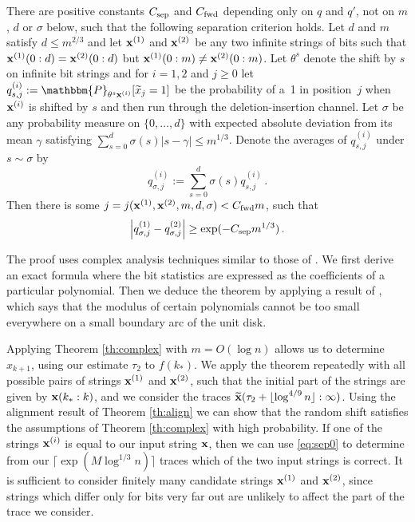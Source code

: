 \documentclass[final,12pt]{colt2018} %
\renewcommand{\P}{\mathbbm{P}}
\newcommand{\1}{\mathbf{1}}
\newcommand{\eqb}{\begin{equation}}
\newcommand{\eqe}{\end{equation}}
\newcommand{\wt}{\widetilde}
\def\x{{\bf x}}
\def\csep{C_{\rm sep}} %
\def\cfwd{C_{\rm fwd}} %
\begin{document}
\begin{theorem}
	\label{th:complex}
	There are positive constants $\csep$ and $\cfwd$ depending only on
	$q$ and $q'$, not on $m$, $d$ or $\sigma$ below, such that the
	following separation criterion holds.
	Let $d$ and $m$ satisfy $d \leq m^{2/3}$ and let $\x^{(1)}$
	and $\x^{(2)}$ be any two infinite strings of bits such that
	$\x^{(1)} (0:d) = \x^{(2)}(0:d)$ but $\x^{(1)} (0:m) \neq \x^{(2)}(0:m)$.
	Let $\theta^s$ denote the shift by $s$ on infinite bit strings and
	for $i = 1,2$ and $j \geq 0$ let $q_{s,j}^{(i)} := \P_{\theta^s \x^{(i)}}
	[\wt x_j = 1]$ be the probability of a~1 in position~$j$ when $\x^{(i)}$ is
	shifted by $s$ and then run through the deletion-insertion channel.
	Let $\sigma$ be any probability measure on $\{ 0 , \ldots , d \}$
	with expected absolute deviation from its mean $\gamma$ satisfying
	$\sum_{s=0}^d \sigma (s) |s - \gamma| \leq m^{1/3}$.  Denote the averages
	of $q^{(i)}_{s,j}$ under $s \sim \sigma$ by
	$$q_{\sigma , j}^{(i)} := \sum_{s=0}^d \sigma (s) q_{s,j}^{(i)} \, .$$
	Then there is some $j = j(\x^{(1)}, \x^{(2)}, m, d, \sigma) < \cfwd m$,
	such that
	\eqb \label{eq:sep0}
	\left | q_{\sigma , j}^{(1)} - q_{\sigma , j}^{(2)} \right |
	\geq \exp (- \csep m^{1/3}) \, .
	\eqe
\end{theorem}
The proof uses complex analysis techniques similar to those of \cite{DOS16,NP16,PZ17}. We first derive an exact formula where the bit statistics are expressed as the coefficients of a particular polynomial. Then we deduce the theorem by applying a result of \citet*{BE97}, which says that the modulus of certain polynomials cannot be too small everywhere on a small boundary arc of the unit disk.

Applying Theorem \ref{th:complex} with $m=O(\log n)$ allows us to determine $x_{k+1}$, using our estimate $\tau_2$ to $f(k_*)$. We apply the theorem repeatedly with all possible pairs of strings $\x^{(1)}$ and $\x^{(2)}$, such that the initial part of the strings are given by $\x(k_*:k)$, and we consider the traces $\wt\x(\tau_2+\lfloor\log^{4/9}n\rfloor:\infty)$. Using the alignment result of Theorem \ref{th:align} we can show that the random shift satisfies the assumptions of Theorem \ref{th:complex} with high probability. If one of the strings $\x^{(i)}$ is equal to our input string $\x$, then we can use \eqref{eq:sep0} to determine from our $\lceil\exp(M\log^{1/3}n)\rceil$ traces which of the two input strings is correct. It is sufficient to consider finitely many candidate strings $\x^{(1)}$ and $\x^{(2)}$, since strings which differ only for bits very far out are unlikely to affect the part of the trace we consider.
\end{document}
